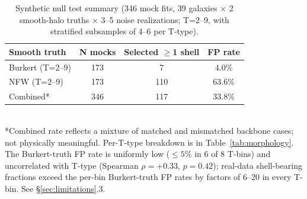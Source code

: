 \begin{table}
\centering
\caption{Synthetic null test summary (346 mock fits, 39 galaxies $\times$ 2 smooth-halo truths $\times$ 3--5 noise realizations; T=2--9, with stratified subsamples of 4--6 per T-type).}
\label{tab:null}
\begin{tabular}{lccc}
\toprule
Smooth truth & N mocks & Selected $\geq$1 shell & FP rate \\
\midrule
Burkert (T=2--9) & 173 & 7 & 4.0\% \\
NFW (T=2--9) & 173 & 110 & 63.6\% \\
Combined* & 346 & 117 & 33.8\% \\
\bottomrule
\end{tabular}
\\[0.5em]
\footnotesize{*Combined rate reflects a mixture of matched and mismatched backbone cases; not physically meaningful. Per-T-type breakdown is in Table~\ref{tab:morphology}. The Burkert-truth FP rate is uniformly low ($\leq 5\%$ in 6 of 8 T-bins) and uncorrelated with T-type (Spearman $\rho = +0.33$, $p = 0.42$); real-data shell-bearing fractions exceed the per-bin Burkert-truth FP rates by factors of 6--20 in every T-bin. See \S\ref{sec:limitations}.3.}
\end{table}

